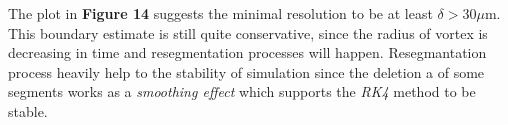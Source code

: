 The plot in \textbf{Figure 14} suggests the minimal resolution to be at least $\delta >30\mu\text{m}$. This boundary estimate is still quite conservative, since the radius of vortex is decreasing in time and resegmentation processes will happen.
Resegmantation process heavily help to the stability of simulation since the deletion a of some segments works as a \textit{smoothing effect} which supports the \textit{RK4} method to be stable.

\newpage

